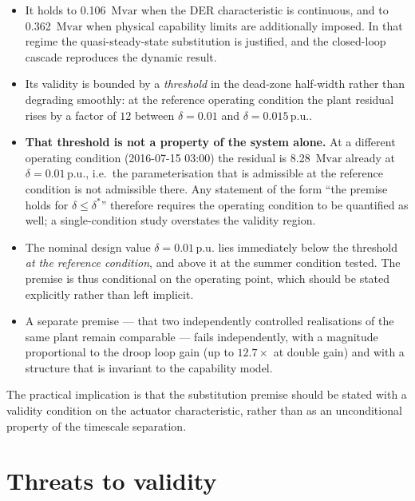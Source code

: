 \documentclass[11pt,a4paper]{article}
\newcommand{\pu}{\ensuremath{\mathrm{p.u.}}}
\newcommand{\Mvar}{\ensuremath{\mathrm{Mvar}}}
\begin{document}
\begin{itemize}
  \item It holds to \SI{0.106}{\Mvar} when the DER characteristic is
        continuous, and to \SI{0.362}{\Mvar} when physical capability
        limits are additionally imposed. In that regime the
        quasi-steady-state substitution is justified, and the closed-loop
        cascade reproduces the dynamic result.
  \item Its validity is bounded by a \emph{threshold} in the dead-zone
        half-width rather than degrading smoothly: at the reference
        operating condition the plant residual rises by a factor of $12$
        between $\delta = 0.01$ and $\delta = 0.015\,\pu$.
  \item \textbf{That threshold is not a property of the system alone.} At a
        different operating condition (2016-07-15 03:00) the residual is
        \SI{8.28}{\Mvar} already at $\delta = 0.01\,\pu$, i.e.\ the
        parameterisation that is admissible at the reference condition is
        not admissible there. Any statement of the form ``the premise holds
        for $\delta \le \delta^{\ast}$'' therefore requires the operating
        condition to be quantified as well; a single-condition study
        overstates the validity region.
  \item The nominal design value $\delta = 0.01\,\pu$ lies immediately
        below the threshold \emph{at the reference condition}, and above it
        at the summer condition tested. The premise is thus conditional on
        the operating point, which should be stated explicitly rather than
        left implicit.
  \item A separate premise --- that two independently controlled
        realisations of the same plant remain comparable --- fails
        independently, with a magnitude proportional to the droop loop gain
        (up to $12.7\times$ at double gain) and with a structure that is
        invariant to the capability model.
\end{itemize}

The practical implication is that the substitution premise should be stated
with a validity condition on the actuator characteristic, rather than as an
unconditional property of the timescale separation.

\section{Threats to validity}
\end{document}
